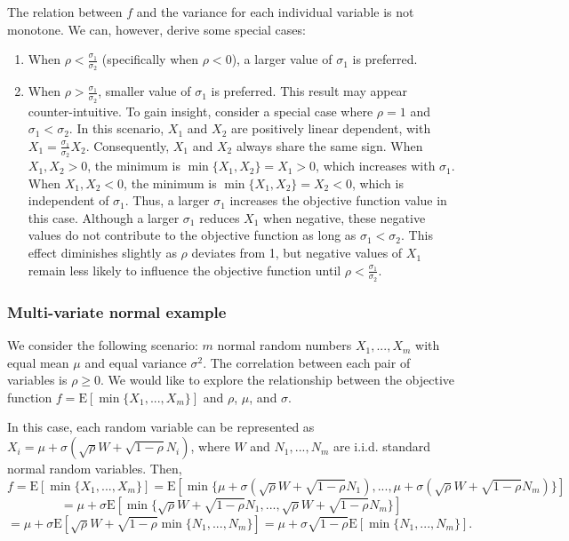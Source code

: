 \documentclass[opre,sglanonrev]{informs4}
\begin{document}
The relation between $f$ and the variance for each individual variable is not monotone. We can, however, derive some special cases:
	\begin{enumerate}
		\item When $\rho<\frac{\sigma_1}{\sigma_2}$ (specifically when $\rho<0$), a larger value of $\sigma_1$ is preferred.
		\item When $\rho>\frac{\sigma_1}{\sigma_2}$, smaller value of $\sigma_1$ is preferred. This result may appear counter-intuitive. To gain insight, consider a special case where $\rho = 1$ and $\sigma_1<\sigma_2$. In this scenario, $X_1$ and $X_2$ are positively linear dependent, with $ X_1 = \frac{\sigma_1}{\sigma_2} X_2$. Consequently, $X_1$ and $X_2$ always share the same sign. When $X_1, X_2 > 0$, the minimum is $\min\{X_1, X_2\} = X_1 > 0$, which increases with $\sigma_1$. When $X_1, X_2 < 0$, the minimum is $\min\{X_1, X_2\} = X_2 < 0$, which is independent of $\sigma_1$. Thus, a larger $\sigma_1$ increases the objective function value in this case. Although a larger $\sigma_1$ reduces $X_1$ when negative, these negative values do not contribute to the objective function as  long as $\sigma_1 < \sigma_2$. This effect diminishes slightly as $\rho$ deviates from 1, but negative values of $X_1$ remain less likely to influence the objective function until $\rho < \frac{\sigma_1}{\sigma_2}$.
	\end{enumerate}


\subsubsection{Multi-variate normal example}
\label{multi-variate}

We consider the following scenario: $m$ normal random numbers $X_1,...,X_m$ with equal mean $\mu$ and equal variance $\sigma^2$. The correlation between each pair of variables is $\rho\geq 0$. We would like to explore the relationship between the objective function  $f = \text{E}[\min\{X_1,...,X_m\}]$ and $\rho$, $\mu$, and $\sigma$.

In this case, each random variable can be represented as $X_i = \mu + \sigma(\sqrt{\rho}W + \sqrt{1-\rho} N_i )$, where $W$ and $N_1,...,N_m$ are i.i.d. standard normal random variables. Then,
$$f = \text{E}[\min\{X_1,...,X_m\}] =  \text{E}[\min\{\mu + \sigma(\sqrt{\rho}W + \sqrt{1-\rho} N_1 ),...,\mu + \sigma(\sqrt{\rho}W + \sqrt{1-\rho} N_m )\}] $$
$$=\mu+ \sigma\text{E}[\min\{\sqrt{\rho}W + \sqrt{1-\rho} N_1 ,...,\sqrt{\rho}W + \sqrt{1-\rho} N_m \}]  $$
$$=\mu + \sigma\text{E}[\sqrt{\rho}W+ \sqrt{1-\rho} \min\{N_1,...,N_m\} ] =\mu + \sigma\sqrt{1-\rho} \text{E}[\min\{N_1,...,N_m\} ]. $$
\end{document}
